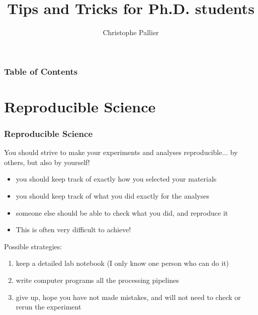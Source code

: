 \documentclass{beamer}
\title[Tips and Tricks]
{Tips and Tricks for Ph.D. students}
\subtitle{}
\author[Christophe Pallier] %
{Christophe Pallier}
\institute
{
  CNRS\\
  Unit\'e INSERM-CEA de Neuroimagerie Cognitive\\
  Gif-sur-Yvette
}
\date[17 Juin 2013] %
\newcounter{saveenumi}
\newcommand{\seti}{\setcounter{saveenumi}{\value{enumi}}}
\newcommand{\conti}{\setcounter{enumi}{\value{saveenumi}}}
\begin{document}
\frame{\titlepage}

\begin{frame}
\frametitle{Table of Contents}
\tableofcontents[currentsection]


\end{frame}






\section{Reproducible Science}

\begin{frame}
\frametitle{Reproducible Science}

You should strive to make your experiments and analyses reproducible... 
by others, but also by yourself!

\pause

{ \fontsize{9pt}{11}\selectfont

\begin{itemize}
\item you should keep track of exactly how you selected your materials
\item you should keep track of what you did exactly for the analyses
\item someone else should be able to check what you did, and reproduce it
\item This is often very difficult to achieve!
\end{itemize} }

\pause
Possible strategies:

{ \fontsize{9pt}{11}\selectfont


\begin{enumerate}
\item keep a detailed lab notebook (I only know one person who can do it) 
\item write computer programs all the processing pipelines
\item give up,  hope you have not made mistakes, and will not need to check or rerun the experiment
\end{enumerate}
}

\end{frame}
\end{document}
